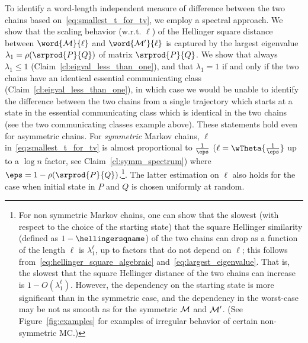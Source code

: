 To identify a word-length independent measure of difference between the two chains based on~\eqref{eq:smallest_t_for_tv}, we employ a spectral approach.
We show that the scaling behavior (w.r.t. $\ell$) of the Hellinger square distance between $\word{\cal M}{\ell}$ and $\word{\cal M'}{\ell}$ is captured by the largest eigenvalue $\lambda_1=\rho(\srprod{P}{Q})$ of matrix $\srprod{P}{Q}$. We show that always $\lambda_1 \le 1$ (Claim~\ref{cl:eigval_less_than_one}), and 
that $\lambda_1=1$ if and only if the two chains have an identical essential communicating class (Claim~\ref{cl:eigval_less_than_one}), in which case we would be unable to identify the difference between the two 
chains from a single trajectory which starts at a state in the essential communicating class which is identical in the two chains (see the two communicating classes example above). These statements hold even for asymmetric chains.
For 
\emph{symmetric} Markov chains,
$\ell$ in~\eqref{eq:smallest_t_for_tv} 
is almost proportional to $\frac{1}{\eps}$ ($\ell=\wTheta{\frac{1}{\eps}}$ up to a $\log n$ factor, see Claim~\ref{cl:symm_spectrum}) where $\eps=1-\rho(\srprod{P}{Q})$.\footnote{
	For non symmetric Markov chains, one can show that the slowest (with respect to the choice of the starting state) that the square Hellinger similarity
	(defined as $1-\hellingersqname$) of the two chains 
	can drop as a function of the length $\ell$ is $\lambda_1^\ell$, up to factors that do not depend on $\ell$; this follows from~\eqref{eq:hellinger_square_algebraic} 
	and~\eqref{eq:largest_eigenvalue}. That is, the slowest that the square Hellinger distance of the two chains can increase is $1-O(\lambda_1^\ell)$. However, the dependency on the
	starting state is more significant than in the symmetric case, and the dependency in the worst-case may be not as smooth as for the symmetric ${\cal M}$ and ${\cal M'}$. (See Figure~\ref{fig:examples} for examples of irregular behavior of certain non-symmetric MC.)
}.
The latter estimation on $\ell$ also holds for the case when initial state in $P$ and $Q$ is chosen uniformly at random.


